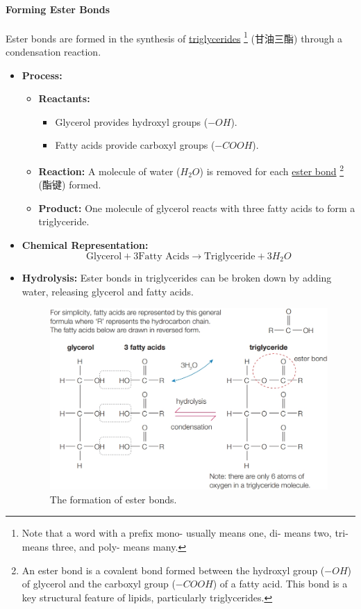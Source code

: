 \paragraph{Forming Ester Bonds} Ester bonds are formed in the synthesis of \underline{triglycerides} \footnote{Note that a
word with a prefix mono- usually means one, di- means two, tri- means three, and poly- means many.} (甘油三酯) through a
condensation reaction.
\begin{itemize}
    \item \textbf{Process:}
    \begin{itemize}
        \item[1.] \textbf{Reactants:}
        \begin{itemize}
            \item Glycerol provides hydroxyl groups ($-OH$).
            \item Fatty acids provide carboxyl groups ($-COOH$).
        \end{itemize}
        \item[2.] \textbf{Reaction:} A molecule of water ($H_2O$) is removed for each \underline{ester bond} \footnote{An ester
        bond is a covalent bond formed between the hydroxyl group ($-OH$) of glycerol and the carboxyl group ($-COOH$) of a fatty
        acid. This bond is a key structural feature of lipids, particularly triglycerides.} (酯键) formed.
        \item[3.] \textbf{Product:} One molecule of glycerol reacts with three fatty acids to form a triglyceride.
    \end{itemize}
    \item \textbf{Chemical Representation:}
    $$\text{Glycerol} + 3\text{Fatty Acids} \rightarrow \text{Triglyceride} + 3H_2O$$
    \item \textbf{Hydrolysis:} Ester bonds in triglycerides can be broken down by adding water, releasing glycerol and fatty
    acids.
    \begin{figure}[H]
        \centering
        \includegraphics[scale=0.35]{Biology/1A/Images/1A-4-4.png}
        \caption{The formation of ester bonds.}
    \end{figure}
\end{itemize}